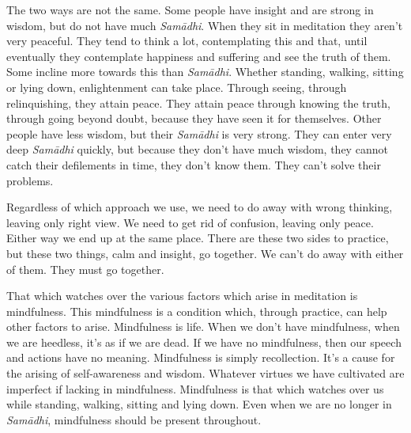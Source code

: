 The two ways are not the same. Some people have insight and are strong in wisdom, but do not have much \textit{Sam\=adhi}. When they sit in meditation they aren't very peaceful. They tend to think a lot, contemplating this and that, until eventually they contemplate happiness and suffering and see the truth of them. Some incline more towards this than \textit{Sam\=adhi}. Whether standing, walking, sitting or lying down, enlightenment can take place. Through seeing, through relinquishing, they attain peace. They attain peace through knowing the truth, through going beyond doubt, because they have seen it for themselves. Other people have less wisdom, but their \textit{Sam\=adhi} is very strong. They can enter very deep \textit{Sam\=adhi} quickly, but because they don't have much wisdom, they \mbox{cannot} catch their defilements in time, they don't know them. They can't solve their problems.

Regardless of which approach we use, we need to do away with wrong thinking, leaving only right view. We need to get rid of confusion, leaving only peace. Either way we end up at the same place. There are these two sides to practice, but these two things, calm and insight, go together. We can't do away with either of them. They must go together.

That which watches over the various factors which arise in meditation is mindfulness. This mindfulness is a condition which, through practice, can help other factors to arise. Mindfulness is life. When we don't have mindfulness, when we are heedless, it's as if we are dead. If we have no mindfulness, then our speech and actions have no meaning. Mindfulness is simply recollection. It's a cause for the arising of self-awareness and wisdom. Whatever virtues we have cultivated are imperfect if lacking in mindfulness. Mindfulness is that which watches over us while standing, walking, sitting and lying down. Even when we are no longer in \textit{Sam\=adhi}, mindfulness should be present throughout.
